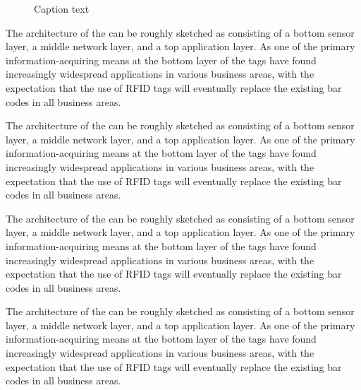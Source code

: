 \documentclass[10pt]{ietbook}
\begin{document}
\begin{figure}[!t]%
\centerline{}
\caption{Caption text}
\end{figure}


\begin{boxes}
{}
{The architecture of the can be roughly sketched
as consisting of a bottom sensor layer, a middle network layer, and a
top application layer. As one of the primary information-acquiring means
at the bottom layer of the
tags have found increasingly widespread applications in various business
areas, with the expectation that the use of RFID tags will eventually
replace the existing bar codes in all business areas.

The architecture of the can be roughly sketched
as consisting of a bottom sensor layer, a middle network layer, and a
top application layer. As one of the primary information-acquiring means
at the bottom layer of the
tags have found increasingly widespread applications in various business
areas, with the expectation that the use of RFID tags will eventually
replace the existing bar codes in all business areas.}
\end{boxes}

The architecture of the can be roughly sketched
as consisting of a bottom sensor layer, a middle network layer, and a
top application layer. 
As one of the primary information-acquiring means
at the bottom layer of the
tags have found increasingly widespread applications in various business
areas, with the expectation that the use of RFID tags will eventually
replace the existing bar codes in all business areas.

The architecture of the can be roughly sketched
as consisting of a bottom sensor layer, a middle network layer, and a
top application layer. As one of the primary information-acquiring means
at the bottom layer of the
tags have found increasingly widespread applications in various business
areas, with the expectation that the use of RFID tags will eventually
replace the existing bar codes in all business areas.
\end{document}
